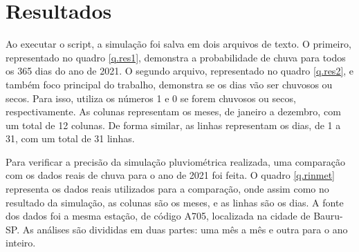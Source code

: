 \chapter{Resultados}
\label{c.resultados}
Ao executar o script, a simulação foi salva em dois arquivos de texto. O primeiro, representado no quadro \ref{q.res1}, demonstra a probabilidade de chuva para todos os 365 dias do ano de 2021. O segundo arquivo, representado no quadro \ref{q.res2}, e também foco principal do trabalho, demonstra se os dias vão ser chuvosos ou secos. Para isso, utiliza os números 1 e 0 se forem chuvosos ou secos, respectivamente. As colunas representam os meses, de janeiro a dezembro, com um total de 12 colunas. De forma similar, as linhas representam os dias, de 1 a 31, com um total de 31 linhas.

Para verificar a precisão da simulação pluviométrica realizada, uma comparação com os dados reais de chuva para o ano de 2021 foi feita. O quadro \ref{q.rinmet} representa os dados reais utilizados para a comparação, onde assim como no resultado da simulação, as colunas são os meses, e as linhas são os dias. A fonte dos dados foi a mesma estação, de código A705, localizada na cidade de Bauru-SP. As análises são divididas em duas partes: uma mês a mês e outra para o ano inteiro.

